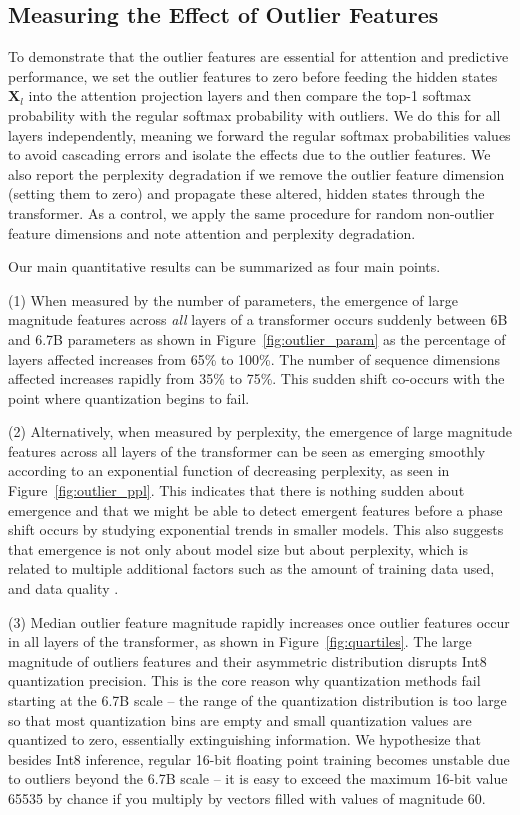 \subsection{Measuring the Effect of Outlier Features}

To demonstrate that the outlier features are essential for attention and predictive performance, we set the outlier features to zero before feeding the hidden states $\mathbf{X}_l$ into the attention projection layers and then compare the top-1 softmax probability with the regular softmax probability with outliers. We do this for all layers independently, meaning we forward the regular softmax probabilities values to avoid cascading errors and isolate the effects due to the outlier features. We also report the perplexity degradation if we remove the outlier feature dimension (setting them to zero) and propagate these altered, hidden states through the transformer. As a control, we apply the same procedure for random non-outlier feature dimensions and note attention and perplexity degradation.

Our main quantitative results can be summarized as four main points. 

(1) When measured by the number of parameters, the emergence of large magnitude features across {\it all} layers of a transformer occurs suddenly between 6B and 6.7B parameters as shown in Figure~\ref{fig:outlier_param} as the percentage of layers affected increases from 65\% to 100\%. The number of sequence dimensions affected increases rapidly from 35\% to 75\%. This sudden shift co-occurs with the point where quantization begins to fail.

(2) Alternatively, when measured by perplexity, the emergence of large magnitude features across all layers of the transformer can be seen as emerging smoothly according to an exponential function of decreasing perplexity, as seen in Figure~\ref{fig:outlier_ppl}. This indicates that there is nothing sudden about emergence and that we might be able to detect emergent features before a phase shift occurs by studying exponential trends in smaller models. This also suggests that emergence is not only about model size but about perplexity, which is related to multiple additional factors such as the amount of training data used, and data quality \citep{hoffmann2022training,henighan2020scaling}.

(3) Median outlier feature magnitude rapidly increases once outlier features occur in all layers of the transformer, as shown in Figure~\ref{fig:quartiles}. The large magnitude of outliers features and their asymmetric distribution disrupts Int8 quantization precision. This is the core reason why quantization methods fail starting at the 6.7B scale -- the range of the quantization distribution is too large so that most quantization bins are empty and small quantization values are quantized to zero, essentially extinguishing information.  We hypothesize that besides Int8 inference, regular 16-bit floating point training becomes unstable due to outliers beyond the 6.7B scale -- it is easy to exceed the maximum 16-bit value 65535 by chance if you multiply by vectors filled with values of magnitude 60.

